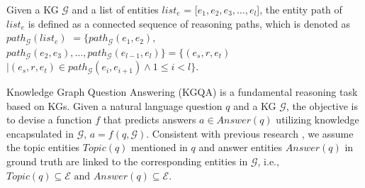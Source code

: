 

\begin{definition}
Given a KG $\mathcal{G}$ and a list of entities $list_e$ = [$e_1, e_2, e_3, \ldots, e_l$], the entity path of $list_e$ is defined as a connected sequence of reasoning paths, which is denoted as $path_{\mathcal{G}}(list_e)$
$= \{path_{\mathcal{G}}(e_1, e_2), $ $
path_{\mathcal{G}}(e_2, e_3), \ldots, path_{\mathcal{G}}(e_{l-1}, e_l) \}=\{(e_s, r, e_t)$ 
$| (e_s, r, e_t) \in path_{\mathcal{G}}(e_{i}, e_{i+1}) \land 1 \leq i < l\}$.
\end{definition}


Knowledge Graph Question Answering (KGQA)
is a fundamental reasoning task based on KGs. Given a natural language question $q$ and a KG $\mathcal{G}$, the objective is to devise a function $f$ that predicts answers $a \in Answer(q)$ utilizing knowledge encapsulated in $\mathcal{G}$, \ie $a = f(q, \mathcal{G})$.
Consistent with previous research \cite{sun2019pullnet, rogluo2023reasoning, tog1.0sun2023think, tog2.0ma2024think},
we assume the topic entities $Topic(q)$ mentioned in $q$ and answer entities  $Answer(q)$ in ground truth are linked to the corresponding entities in $\mathcal{G}$, i.e., $Topic(q) \subseteq \mathcal{E} \text{ and }  Answer(q) \subseteq \mathcal{E}$.


